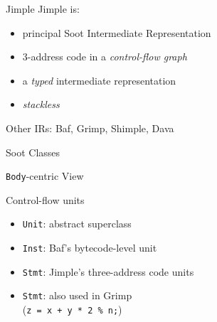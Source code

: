 \begin{slide}{Jimple}
Jimple is:
\begin{itemize}
\item principal Soot Intermediate Representation
\item 3-address code in a \emph{control-flow graph}
\item a \emph{typed} intermediate representation
\item \emph{stackless}
\end{itemize}

\quad

Other IRs: Baf, Grimp, Shimple, Dava
\end{slide}

\begin{slide}{Soot Classes}
\vspace*{-0.1in}
\begin{center}

\end{center}
\end{slide}

\begin{slide}{{\tt Body}-centric View}
\vspace*{-0.1in}
\begin{center}

\end{center}
\end{slide}

\begin{slide}{Control-flow units}
\begin{itemize}
\item {\tt Unit}: abstract superclass

\item {\tt Inst}: Baf's bytecode-level unit

\item {\tt Stmt}: Jimple's three-address code units

\item {\tt Stmt}: also used in Grimp\\
\qquad \qquad ({\tt z = x + y * 2 \% n;})
\end{itemize}
\end{slide}

